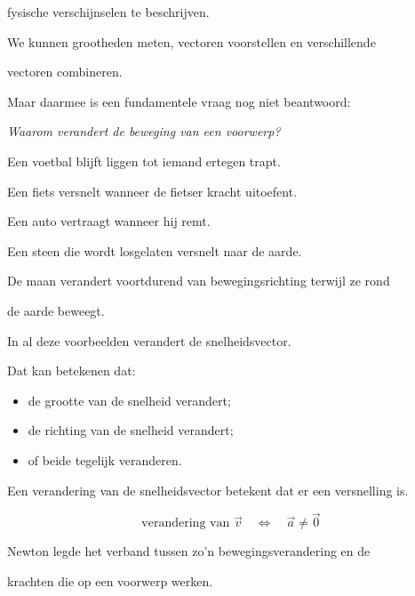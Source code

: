 \documentclass{ximera}
\begin{document}
fysische verschijnselen te beschrijven.

We kunnen grootheden meten, vectoren voorstellen en verschillende

vectoren combineren.

Maar daarmee is een fundamentele vraag nog niet beantwoord:

\begin{center}

\textit{Waarom verandert de beweging van een voorwerp?}

\end{center}

Een voetbal blijft liggen tot iemand ertegen trapt.

Een fiets versnelt wanneer de fietser kracht uitoefent.

Een auto vertraagt wanneer hij remt.

Een steen die wordt losgelaten versnelt naar de aarde.

De maan verandert voortdurend van bewegingsrichting terwijl ze rond

de aarde beweegt.

In al deze voorbeelden verandert de snelheidsvector.

Dat kan betekenen dat:

\begin{itemize}

 \item de grootte van de snelheid verandert;

 \item de richting van de snelheid verandert;

 \item of beide tegelijk veranderen.

\end{itemize}

Een verandering van de snelheidsvector betekent dat er een versnelling is.

\[\boxed{ \text{verandering van }\vec v \quad\Longleftrightarrow\quad \vec a\neq\vec 0 }\]

Newton legde het verband tussen zo'n bewegingsverandering en de

krachten die op een voorwerp werken.




\end{document}

